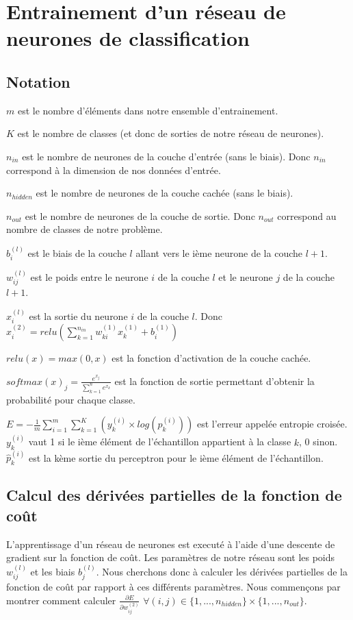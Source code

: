 \documentclass[a4paper,11pt,oneside,roman]{article}
\begin{document}
    \section{Entrainement d'un réseau de neurones de classification}
    \subsection{Notation}
    $m$ est le nombre d'éléments dans notre ensemble d'entrainement.

    $K$ est le nombre de classes (et donc de sorties de notre réseau de neurones).

    $n_{in}$ est le nombre de neurones de la couche d'entrée (sans le biais). Donc $n_{in}$ correspond à la dimension de nos données d'entrée.
    
    $n_{hidden}$ est le nombre de neurones de la couche cachée (sans le biais).
    
    $n_{out}$ est le nombre de neurones de la couche de sortie. Donc $n_{out}$ correspond au nombre de classes de notre problème.
    
    $b_i^{(l)}$ est le biais de la couche $l$ allant vers le ième neurone de la couche $l+1$.

    $w_{ij}^{(l)}$ est le poids entre le neurone $i$ de la couche $l$ et le neurone $j$ de la couche $l+1$.
    
    $x_{i}^{(l)}$ est la sortie du neurone $i$ de la couche $l$. Donc $x_{i}^{(2)} = relu(\sum\limits_{k=1}^{n_{in}} w_{ki}^{(1)}x_{k}^{(1)} + b_i^{(1)})$
    
    $relu(x) = max(0,x)$ est la fonction d'activation de la couche cachée.

    $softmax(x)_j = \frac{e^{x_j}}{\sum\limits_{k=1}^n e^{x_k}}$ est la fonction de sortie permettant d'obtenir la probabilité pour chaque classe.

    $E = -\frac{1}{m} \sum\limits_{i=1}^m\sum\limits_{k=1}^K (y_{k}^{(i)} \times log(\hat{p}_{k}^{(i)}))$ est l'erreur appelée entropie croisée.
    $y_{k}^{(i)}$ vaut 1 si le ième élément de l'échantillon appartient à la classe $k$, 0 sinon. $\hat{p}_{k}^{(i)}$ est la kème sortie du perceptron pour le ième élément de l'échantillon.

    \subsection{Calcul des dérivées partielles de la fonction de coût}

    L'apprentissage d'un réseau de neurones est executé à l'aide d'une descente de gradient sur la fonction de coût. Les paramètres de notre réseau sont les poids $w_{ij}^{(l)}$ et les biais $b_j^{(l)}$.
    Nous cherchons donc à calculer les dérivées partielles de la fonction de coût par rapport à ces différents paramètres. Nous commençons par montrer comment calculer $\frac{\partial E}{\partial w_{ij}^{(2)}}$ $\forall (i,j) \in \{1, ..., n_{hidden}\} \times \{1, ..., n_{out}\}.$
\end{document}
